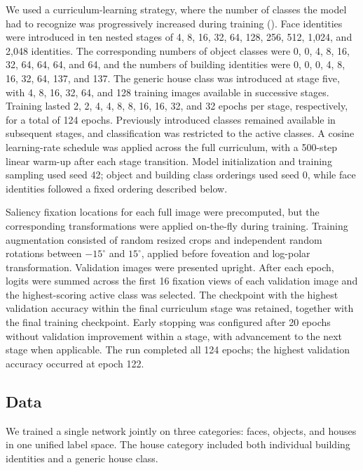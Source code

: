 We used a curriculum-learning strategy, where the number of classes the model had to recognize was progressively increased during training (\cite{bengio2009curriculum}). Face identities were introduced in ten nested stages of 4, 8, 16, 32, 64, 128, 256, 512, 1,024, and 2,048 identities. The corresponding numbers of object classes were 0, 0, 4, 8, 16, 32, 64, 64, 64, and 64, and the numbers of building identities were 0, 0, 0, 4, 8, 16, 32, 64, 137, and 137. The generic house class was introduced at stage five, with 4, 8, 16, 32, 64, and 128 training images available in successive stages. Training lasted 2, 2, 4, 4, 8, 8, 16, 16, 32, and 32 epochs per stage, respectively, for a total of 124 epochs. Previously introduced classes remained available in subsequent stages, and classification was restricted to the active classes. A cosine learning-rate schedule was applied across the full curriculum, with a 500-step linear warm-up after each stage transition. Model initialization and training sampling used seed 42; object and building class orderings used seed 0, while face identities followed a fixed ordering described below.

Saliency fixation locations for each full image were precomputed, but the corresponding transformations were applied on-the-fly during training. Training augmentation consisted of random resized crops and independent random rotations between $-15^\circ$ and $15^\circ$, applied before foveation and log-polar transformation. Validation images were presented upright. After each epoch, logits were summed across the first 16 fixation views of each validation image and the highest-scoring active class was selected. The checkpoint with the highest validation accuracy within the final curriculum stage was retained, together with the final training checkpoint. Early stopping was configured after 20 epochs without validation improvement within a stage, with advancement to the next stage when applicable. The run completed all 124 epochs; the highest validation accuracy occurred at epoch 122.

\subsection{Data}
We trained a single network jointly on three categories: faces, objects, and houses in one unified label space. The house category included both individual building identities and a generic house class.

